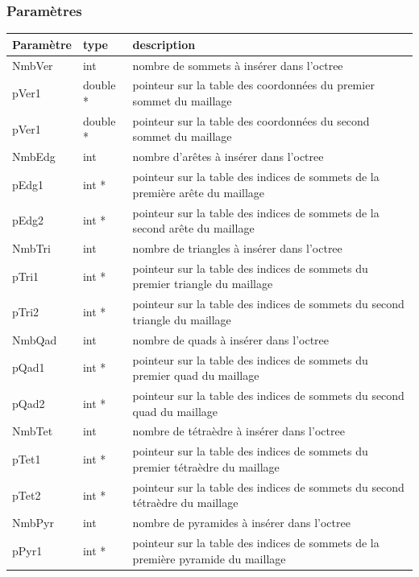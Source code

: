 \documentclass[a4paper,12pt]{article}
\begin{document}
\subsubsection*{Paramètres}

\begin{tabular}{|m{2cm}|m{2cm}|m{10cm}|}
\hline
Paramètre  & type     & description \\
\hline
NmbVer     & int      & nombre de sommets à insérer dans l'octree \\
\hline
pVer1      & double * & pointeur sur la table des coordonnées du premier sommet du maillage \\
\hline
pVer1      & double * & pointeur sur la table des coordonnées du second sommet du maillage \\
\hline
NmbEdg     & int      & nombre d'arêtes à insérer dans l'octree  \\
\hline
pEdg1      & int *    & pointeur sur la table des indices de sommets de la première arête du maillage \\
\hline
pEdg2      & int *    & pointeur sur la table des indices de sommets de la second arête du maillage \\
\hline
NmbTri     & int      & nombre de triangles à insérer dans l'octree  \\
\hline
pTri1      & int *    & pointeur sur la table des indices de sommets du premier triangle du maillage \\
\hline
pTri2      & int *    & pointeur sur la table des indices de sommets du second triangle du maillage \\
\hline
NmbQad     & int      & nombre de quads à insérer dans l'octree  \\
\hline
pQad1      & int *    & pointeur sur la table des indices de sommets du premier quad du maillage \\
\hline
pQad2      & int *    & pointeur sur la table des indices de sommets du second quad du maillage \\
\hline
NmbTet     & int      & nombre de tétraèdre à insérer dans l'octree  \\
\hline
pTet1      & int *    & pointeur sur la table des indices de sommets du premier tétraèdre du maillage \\
\hline
pTet2      & int *    & pointeur sur la table des indices de sommets du second tétraèdre du maillage \\
\hline
NmbPyr     & int      & nombre de pyramides à insérer dans l'octree  \\
\hline
pPyr1      & int *    & pointeur sur la table des indices de sommets de la première pyramide du maillage \\

\end{tabular}
\end{document}
